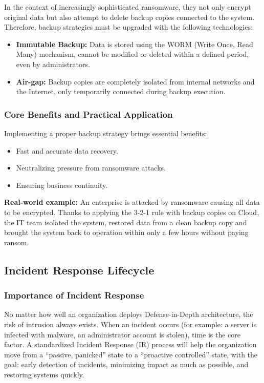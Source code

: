 In the context of increasingly sophisticated ransomware, they not only encrypt original data but also attempt to delete backup copies connected to the system. Therefore, backup strategies must be upgraded with the following technologies:

\begin{itemize}
    \item \textbf{Immutable Backup:} Data is stored using the WORM (Write Once, Read Many) mechanism, cannot be modified or deleted within a defined period, even by administrators.
    
    \item \textbf{Air-gap:} Backup copies are completely isolated from internal networks and the Internet, only temporarily connected during backup execution.
\end{itemize}

\subsubsection{Core Benefits and Practical Application}

Implementing a proper backup strategy brings essential benefits:

\begin{itemize}
    \item Fast and accurate data recovery.
    \item Neutralizing pressure from ransomware attacks.
    \item Ensuring business continuity.
\end{itemize}

\textbf{Real-world example:} An enterprise is attacked by ransomware causing all data to be encrypted. Thanks to applying the 3-2-1 rule with backup copies on Cloud, the IT team isolated the system, restored data from a clean backup copy and brought the system back to operation within only a few hours without paying ransom.

\subsection{Incident Response Lifecycle}

\subsubsection{Importance of Incident Response}

No matter how well an organization deploys Defense-in-Depth architecture, the risk of intrusion always exists. When an incident occurs (for example: a server is infected with malware, an administrator account is stolen), time is the core factor. A standardized Incident Response (IR) process will help the organization move from a ``passive, panicked'' state to a ``proactive controlled'' state, with the goal: early detection of incidents, minimizing impact as much as possible, and restoring systems quickly.

